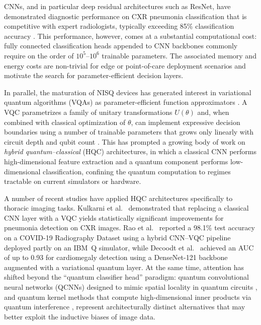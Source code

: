 \documentclass[11pt,a4paper]{article}
\begin{document}
CNNs, and in particular deep residual architectures such as ResNet, have
demonstrated diagnostic performance on CXR pneumonia classification that is
competitive with expert radiologists, typically exceeding 85\% classification
accuracy \cite{he2016,kundu2021,ortiz2022}.  This performance,
however, comes at a substantial computational cost: fully connected
classification heads appended to CNN backbones commonly require on the order
of $10^5$--$10^6$ trainable parameters.  The associated memory and energy
costs are non-trivial for edge or point-of-care deployment scenarios and
motivate the search for parameter-efficient decision layers.

In parallel, the maturation of NISQ devices has generated interest in
variational quantum algorithms (VQAs) as parameter-efficient function
approximators \cite{schuld2018,preskill2018}.  A VQC parametrizes a family of
unitary transformations $U(\theta)$ and, when combined with classical
optimization of $\theta$, can implement expressive decision boundaries using
a number of trainable parameters that grows only linearly with circuit depth
and qubit count \cite{mitarai2018,biamonte2017}.  This has prompted a growing
body of work on \emph{hybrid quantum--classical} (HQC) architectures, in which
a classical CNN performs high-dimensional feature extraction and a quantum
component performs low-dimensional classification, confining the quantum
computation to regimes tractable on current simulators or hardware.

A number of recent studies have applied HQC architectures specifically to
thoracic imaging tasks.  Kulkarni et al.~\cite{kulkarni2023} demonstrated that
replacing a classical CNN layer with a VQC yields statistically significant
improvements for pneumonia detection on CXR images.  Rao et
al.~\cite{rao2024} reported a 98.1\% test accuracy on a COVID-19 Radiography
Dataset using a hybrid CNN--VQC pipeline deployed partly on an IBM~Q simulator,
while Decoodt et al.~\cite{decoodt2023} achieved an AUC of up to 0.93 for
cardiomegaly detection using a DenseNet-121 backbone augmented with a
variational quantum layer.  At the same time, attention has shifted beyond the
``quantum classifier head'' paradigm: quantum convolutional neural networks
(QCNNs) designed to mimic spatial locality in quantum circuits
\cite{cong2019,wei2022}, and quantum kernel methods that compute high-dimensional
inner products via quantum interference \cite{havlicek2019,haug2021}, represent
architecturally distinct alternatives that may better exploit the inductive
biases of image data.
\end{document}
